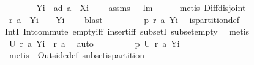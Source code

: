 \begin{isabellebody}
\ \ \ \ \isamarkupfalse%
\ \isamarkupfalse%
\ {\isachardoublequoteopen}{\isacharquery}Yi\ {\isasyminter}\ {\isacharparenleft}a{\isacharbackquote}{\isacharbackquote}{\isacharparenleft}{\isacharquery}d\ a\ {\isacharminus}\ {\isacharquery}Xi{\isacharparenright}{\isacharparenright}\ {\isacharequal}\ {\isacharbraceleft}{\isacharbraceright}{\isachardoublequoteclose}\ \isamarkupfalse%
\ assms\ {}\ {}\ lm{}{}\isanewline
\ \ \ \ \isamarkupfalse%
\ {\isacharparenleft}metis\ Diff{\isacharunderscore}disjoint{\isacharparenright}\isanewline
\ \ \ \ \isamarkupfalse%
\ \isamarkupfalse%
\ \isamarkupfalse%
\ {\isachardoublequoteopen}{\isacharquery}r\ {\isacharquery}a{}\ {\isasyminter}\ {\isacharquery}Yi\ {\isacharequal}\ {\isacharbraceleft}{\isacharbraceright}\ {\isacharampersand}\ {\isacharquery}Yi\ {\isasymnoteq}\ {\isacharbraceleft}{\isacharbraceright}{\isachardoublequoteclose}\ \isamarkupfalse%
\ blast\isanewline
\ \ \ \ \isamarkupfalse%
\ \isamarkupfalse%
\ \isamarkupfalse%
\ {\isachardoublequoteopen}{\isacharquery}p\ {\isacharbraceleft}{\isacharquery}r\ {\isacharquery}a{}{\isacharcomma}\ {\isacharquery}Yi{\isacharbraceright}{\isachardoublequoteclose}\ \isamarkupfalse%
\ is{\isacharunderscore}partition{\isacharunderscore}def\ \isamarkupfalse%
\ \ \isanewline
IntI\ Int{\isacharunderscore}commute\ empty{\isacharunderscore}iff\ insert{\isacharunderscore}iff\ subsetI\ subset{\isacharunderscore}empty\ \isamarkupfalse%
\ metis\isanewline
\ \ \ \ \isamarkupfalse%
\ \isamarkupfalse%
\ {\isachardoublequoteopen}{\isacharquery}U\ {\isacharbraceleft}{\isacharquery}r\ {\isacharquery}a{}{\isacharcomma}\ {\isacharquery}Yi{\isacharbraceright}\ {\isasymsubseteq}\ {\isacharquery}r\ a{\isachardoublequoteclose}\ \isamarkupfalse%
\ auto\isanewline
\ \ \ \ \isamarkupfalse%
\ \isamarkupfalse%
\ \isamarkupfalse%
\ {\isachardoublequoteopen}{\isacharquery}p\ {\isacharparenleft}{\isacharquery}U\ {\isacharbraceleft}{\isacharquery}r\ {\isacharquery}a{}{\isacharcomma}\ {\isacharquery}Yi{\isacharbraceright}{\isacharparenright}{\isachardoublequoteclose}\ \isamarkupfalse%
\ {\isacharparenleft}metis\ {\isachardoublequoteopen}{}{\isachardoublequoteclose}\ Outside{\isacharunderscore}def\ subset{\isacharunderscore}is{\isacharunderscore}partition{\isacharparenright}\isanewline

\end{isabellebody}
